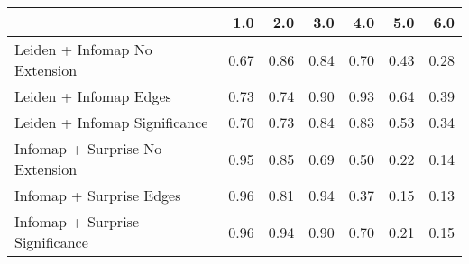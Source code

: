 \begin{tabular}{lrrrrrr}
\toprule
{} &  1.0 &  2.0 &  3.0 &  4.0 &  5.0 &  6.0 \\
\midrule
Leiden + Infomap No Extension   & 0.67 & 0.86 & 0.84 & 0.70 & 0.43 & 0.28 \\
Leiden + Infomap Edges          & 0.73 & 0.74 & 0.90 & 0.93 & 0.64 & 0.39 \\
Leiden + Infomap Significance   & 0.70 & 0.73 & 0.84 & 0.83 & 0.53 & 0.34 \\
Infomap + Surprise No Extension & 0.95 & 0.85 & 0.69 & 0.50 & 0.22 & 0.14 \\
Infomap + Surprise Edges        & 0.96 & 0.81 & 0.94 & 0.37 & 0.15 & 0.13 \\
Infomap + Surprise Significance & 0.96 & 0.94 & 0.90 & 0.70 & 0.21 & 0.15 \\
\bottomrule
\end{tabular}

